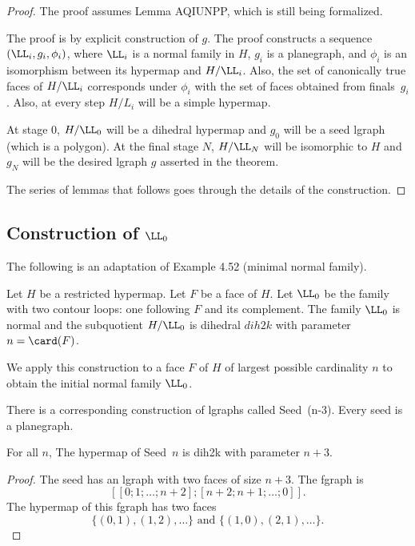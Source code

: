 \begin{proof}  The proof assumes Lemma AQIUNPP,
which is still being formalized.

The proof is by explicit construction of $g$.  The proof constructs a
sequence $(\LL_i,g_i,\phi_i)$, where $\LL_i$ is a normal family in
$H$, $g_i$ is a planegraph, and $\phi_i$ is an isomorphism between its
hypermap and $H/\LL_i$.  Also, the set of canonically true faces of
$H/\LL_i$ corresponds under $\phi_i$ with the set of faces obtained
from finals~$g_i$.  Also, at every step $H/L_i$ will be a simple
hypermap.

At stage $0$, $H/\LL_0$ will be a dihedral hypermap and $g_0$ will be
a seed lgraph (which is a polygon).  At the final stage $N$, $H/\LL_N$
will be isomorphic to $H$ and $g_N$ will be the desired lgraph $g$
asserted in the theorem.

The series of lemmas that follows goes through the details
of the construction.
\end{proof}

\subsection{Construction of $\LL_0$}


The following is an adaptation of Example 4.52 (minimal normal family).

\begin{lemma} Let $H$ be a restricted hypermap.
  Let $F$ be a face of $H$.  Let $\LL_0$ be the family with two
  contour loops: one following $F$ and its complement.  The family
  $\LL_0$ is normal and the subquotient $H/\LL_0$ is dihedral 
  $dih2k$ with parameter $n=\card(F)$.
\end{lemma} 

We apply this construction to a face $F$ of $H$ of largest possible
cardinality $n$ to obtain the initial normal family $\LL_0$.

There is a corresponding construction of lgraphs called
Seed~(n-3).  Every seed is a planegraph.

\begin{lemma} For all $n$,
The hypermap of Seed~$n$ is dih2k with parameter $n+3$.
\end{lemma} 

\begin{proof}
The seed has an lgraph with two faces of size $n+3$.
The fgraph is 
\[
[[0;1;\ldots;n+2];[n+2;n+1;\ldots;0]].
\]
The hypermap of this fgraph has two faces
\[
\{(0,1),(1,2),\ldots\} \text{ and } \{(1,0),(2,1),\ldots\}.
\]
\end{proof}

